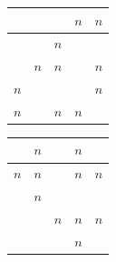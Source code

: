 \documentclass[12pt]{scrartcl}
\begin{document}
\begin{soaljawab}
\begin{solusi}
        \begin{center}
        \begin{tabular}{ |c|c|c|c|c| }
        \hline
        &  &  &  $n$ & $n$ \\
        \hline
        &  & $n$ &  &  \\
        \hline
        &  $n$ &  $n$ &  & $n$ \\
        \hline
        $n$ &  &  & & $n$ \\
        \hline
        $n$ &  & $n$ & $n$ &  \\
        \hline
        \end{tabular}
        \quad
        \begin{tabular}{ |c|c|c|c|c| }
        \hline
        & $n$ &  & $n$ &  \\
        \hline
        $n$ & $n$ &  & $n$ & $n$\\
        \hline
        & $n$ & & & \\
        \hline
        & &$n$ & $n$& $n$ \\
        \hline
        & &  & $n$ & \\
        \hline
        \end{tabular}
        \end{center}
    \end{solusi}
\end{soaljawab}
\end{document}
